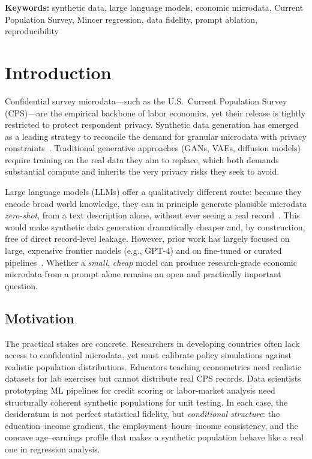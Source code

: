 \documentclass[11pt]{article}
\begin{document}
\medskip
\noindent\textbf{Keywords:} synthetic data, large language models, economic microdata, Current Population Survey, Mincer regression, data fidelity, prompt ablation, reproducibility

\section{Introduction}
\label{sec:introduction}

Confidential survey microdata---such as the U.S.\ Current Population Survey (CPS)---are the empirical backbone of labor economics, yet their release is tightly restricted to protect respondent privacy.
Synthetic data generation has emerged as a leading strategy to reconcile the demand for granular microdata with privacy constraints~\cite{seedat2024curatedllm}.
Traditional generative approaches (GANs, VAEs, diffusion models) require training on the real data they aim to replace, which both demands substantial compute and inherits the very privacy risks they seek to avoid.

Large language models (LLMs) offer a qualitatively different route: because they encode broad world knowledge, they can in principle generate plausible microdata \emph{zero-shot}, from a text description alone, without ever seeing a real record~\cite{borisov2023great,fang2024llmtabular}.
This would make synthetic data generation dramatically cheaper and, by construction, free of direct record-level leakage.
However, prior work has largely focused on large, expensive frontier models (e.g., GPT-4) and on fine-tuned or curated pipelines~\cite{seedat2024curatedllm}.
Whether a \emph{small}, \emph{cheap} model can produce research-grade economic microdata from a prompt alone remains an open and practically important question.

\subsection{Motivation}

The practical stakes are concrete.
Researchers in developing countries often lack access to confidential microdata, yet must calibrate policy simulations against realistic population distributions.
Educators teaching econometrics need realistic datasets for lab exercises but cannot distribute real CPS records.
Data scientists prototyping ML pipelines for credit scoring or labor-market analysis need structurally coherent synthetic populations for unit testing.
In each case, the desideratum is not perfect statistical fidelity, but \emph{conditional structure}: the education--income gradient, the employment--hours--income consistency, and the concave age--earnings profile that makes a synthetic population behave like a real one in regression analysis.
\end{document}

